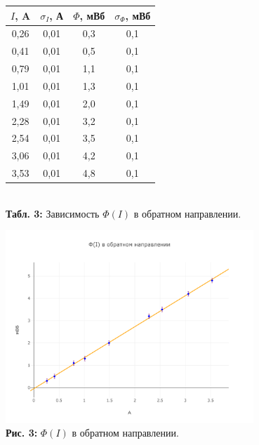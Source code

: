 \documentclass[12pt,a4paper]{scrartcl}
\begin{document}
  \begin{center}
\begin{tabular}{|c|c|c|c|}
\hline
$I$, A & $\sigma_I$, А & $\Phi$, мВб & $\sigma_{\Phi}$, мВб \\ \hline
0,26 & 0,01 & 0,3 & 0,1 \\ \hline
0,41 & 0,01 & 0,5 & 0,1 \\ \hline
0,79 & 0,01 & 1,1 & 0,1 \\ \hline
1,01 & 0,01 & 1,3 & 0,1 \\ \hline
1,49 & 0,01 & 2,0 & 0,1 \\ \hline
2,28 & 0,01 & 3,2 & 0,1 \\ \hline
2,54 & 0,01 & 3,5 & 0,1 \\ \hline
3,06 & 0,01 & 4,2 & 0,1 \\ \hline
3,53 & 0,01 & 4,8 & 0,1 \\ \hline
\end{tabular}\\
\textbf{Табл. 3:} Зависимость $\Phi (I)$ в обратном направлении.
  \end{center} 
 \begin{center}
    \includegraphics[width = 0.7\textwidth]{PIC_3.png}\\
  \textbf{Рис. 3:} $\Phi (I)$ в обратном направлении.
  \end{center}  
  
\end{document}
